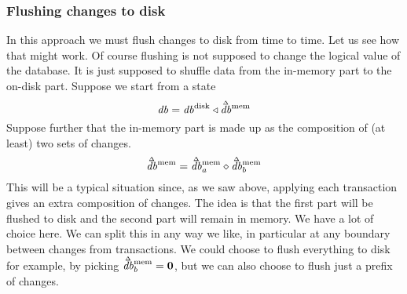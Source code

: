\documentclass[11pt,a4paper]{article}
\newcommand\deltavar[1]{\accentset{\Delta}{#1}}
\begin{document}
\subsubsection{Flushing changes to disk}
In this approach we must flush changes to disk from time to time. Let us see
how that might work. Of course flushing is not supposed to change the logical
value of the database. It is just supposed to shuffle data from the in-memory
part to the on-disk part. Suppose we start from a state
\[
\mathit{db} = \mathit{db}^{\mathrm{disk}}
      \triangleleft \deltavar{\mathit{db}}^{\mathrm{mem}}
\]
Suppose further that the in-memory part is made up as the composition of (at
least) two sets of changes.
\[
\deltavar{\mathit{db}}^{\mathrm{mem}} = \deltavar{\mathit{db}}^{\mathrm{mem}}_a \diamond \deltavar{\mathit{db}}^{\mathrm{mem}}_b
\]
This will be a typical situation since, as we saw above, applying each
transaction gives an extra composition of changes. The idea is that the first
part will be flushed to disk and the second part will remain in memory. We have
a lot of choice here. We can split this in any way we like, in particular at
any boundary between changes from transactions. We could choose to flush
everything to disk for example, by picking
$\deltavar{\mathit{db}}^{\mathrm{mem}}_b = \mathbf{0}$,
but we can also choose to flush just a prefix of changes.
\end{document}
